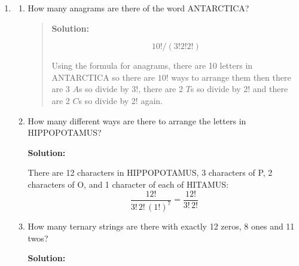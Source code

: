 \documentclass[10pt,letterpaper,unboxed,cm]{article}
\begin{document}
\begin{enumerate}
\begin{enumerate}
\begin{quote}
{\bf Solution:}

$$1 + {15\choose 5}*5! + {15\choose 10}*10!/(2^5) + 15!/(3!)^5$$

They could all have 0 candies (1 way to do this.) They could all have 1 candy (${15\choose 5}*5!$, choose 5 of the candies and arrange them one in each stocking in $5!$ ways. They could all have 2 candies (${15\choose 10}*10!/(2^5)$, choose 10 of the candies and arrange them in $10!$ ways then divide by 2 for each stocking because the order you put the candies in the stockings does not matter. They could all have 3 candies ($15!/(3!^5)$, arrange the candies in $15!$ ways then divide by $3!$ for each stocking because the order you put the candies in the stockings does not matter.
\end{quote}

\end{enumerate}




\item
\begin{enumerate}
\item


How many anagrams are there of the word ANTARCTICA?

\begin{quote}
{\bf Solution:}

$$10!/(3!2!2!)$$

Using the formula for anagrams, there are 10 letters in ANTARCTICA so there are $10!$ ways to arrange them then there are 3 $A$s so divide by $3!$, there are 2 $T$s so divide by 2! and there are 2 $C$s so divide by 2! again.

\end{quote}



\item
 How many different ways are there to arrange the letters in HIPPOPOTAMUS?

\textbf{Solution:} 

There are 12 characters in HIPPOPOTAMUS, 3 characters of P, 2 characters of O, and 1 character of each of HITAMUS:
$$\frac{12!}{3!\,2!\,(1!)^7} = \frac{12!}{3!\,2!}$$



\item

How many ternary strings are there with exactly 12 zeros, 8 ones and 11 twos?

\textbf{Solution: }


\end{enumerate}
\end{enumerate}
\end{document}
